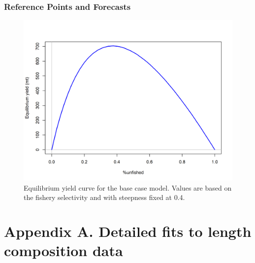 \documentclass[12pt,]{article}
\begin{document}
\FloatBarrier

\hypertarget{reference-points-and-forecasts}{%
\subsubsection{Reference Points and
Forecasts}\label{reference-points-and-forecasts}}

\FloatBarrier

\vspace{2.5cm}

\begin{figure}[!h]
\begin{centering}
\includegraphics{r4ss/plots_mod1/yield1_yield_curve.png}
\caption{Equilibrium yield curve for the base case model. Values are based on the fishery selectivity and with steepness fixed at 0.4.}\label{fig:yield1_yield_curve}
\end{centering}
\end{figure}

\FloatBarrier

\newpage

\renewcommand{\thefigure}{\arabic{figure}}
\renewcommand{\thetable}{\arabic{table}}
\setcounter{figure}{0}
\setcounter{table}{0}

\newpage
\setcounter{page}{1}
\renewcommand{\thepage}{A-\arabic{page}}
\renewcommand{\thefigure}{A-\arabic{figure}}

\FloatBarrier
\newpage

\hypertarget{appendix-a.-detailed-fits-to-length-composition-data}{%
\section*{Appendix A. Detailed fits to length composition
data}\label{appendix-a.-detailed-fits-to-length-composition-data}}
\end{document}
